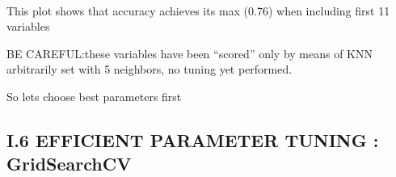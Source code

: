 \documentclass[11pt]{article}
\begin{document}
    \begin{center}
    \end{center}
    { \hspace*{\fill} \\}
    
    This plot shows that accuracy achieves its max (0.76) when including
first 11 variables

BE CAREFUL:these variables have been ``scored'' only by means of KNN
arbitrarily set with 5 neighbors, no tuning yet performed.

So lets choose best parameters first

    \hypertarget{i.6-efficient-parameter-tuning-gridsearchcv}{%
\subsection{I.6 EFFICIENT PARAMETER TUNING :
GridSearchCV}\label{i.6-efficient-parameter-tuning-gridsearchcv}}
\end{document}
